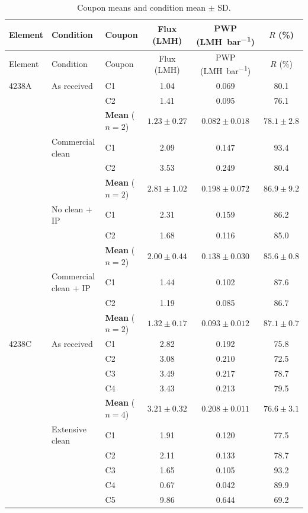 {\footnotesize
\begin{longtable}{lllccc}
  \caption{Coupon means and condition mean $\pm$ SD.}
  \label{tab:app-coupons}\\
  \toprule
  Element & Condition & Coupon & Flux (\unit{LMH}) & PWP (\unit{LMH.bar^{-1}}) & $R$ (\%) \\
  \midrule
  \endfirsthead
  \toprule
  Element & Condition & Coupon & Flux (\unit{LMH}) & PWP (\unit{LMH.bar^{-1}}) & $R$ (\%) \\
  \midrule
  \endhead
  \bottomrule
  \endfoot
  4238A & As received & C1 & 1.04 & 0.069 & 80.1 \\
   &  & C2 & 1.41 & 0.095 & 76.1 \\
   & & \textbf{Mean} ($n=2$) & $1.23 \pm 0.27$ & $0.082 \pm 0.018$ & $78.1 \pm 2.8$ \\
  \addlinespace
   & Commercial clean & C1 & 2.09 & 0.147 & 93.4 \\
   &  & C2 & 3.53 & 0.249 & 80.4 \\
   & & \textbf{Mean} ($n=2$) & $2.81 \pm 1.02$ & $0.198 \pm 0.072$ & $86.9 \pm 9.2$ \\
  \addlinespace
   & No clean + IP & C1 & 2.31 & 0.159 & 86.2 \\
   &  & C2 & 1.68 & 0.116 & 85.0 \\
   & & \textbf{Mean} ($n=2$) & $2.00 \pm 0.44$ & $0.138 \pm 0.030$ & $85.6 \pm 0.8$ \\
  \addlinespace
   & Commercial clean + IP & C1 & 1.44 & 0.102 & 87.6 \\
   &  & C2 & 1.19 & 0.085 & 86.7 \\
   & & \textbf{Mean} ($n=2$) & $1.32 \pm 0.17$ & $0.093 \pm 0.012$ & $87.1 \pm 0.7$ \\
  \midrule
  4238C & As received & C1 & 2.82 & 0.192 & 75.8 \\
   &  & C2 & 3.08 & 0.210 & 72.5 \\
   &  & C3 & 3.49 & 0.217 & 78.7 \\
   &  & C4 & 3.43 & 0.213 & 79.5 \\
   & & \textbf{Mean} ($n=4$) & $3.21 \pm 0.32$ & $0.208 \pm 0.011$ & $76.6 \pm 3.1$ \\
  \addlinespace
   & Extensive clean & C1 & 1.91 & 0.120 & 77.5 \\
   &  & C2 & 2.11 & 0.133 & 78.7 \\
   &  & C3 & 1.65 & 0.105 & 93.2 \\
   &  & C4 & 0.67 & 0.042 & 89.9 \\
   &  & C5 & 9.86 & 0.644 & 69.2 \\

\end{longtable}}
